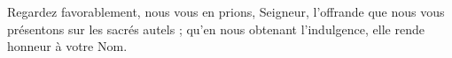 Regardez favorablement, nous vous en prions, Seigneur, l’offrande que nous vous présentons sur les sacrés autels ; qu’en nous obtenant l’indulgence, elle rende honneur à votre Nom.
